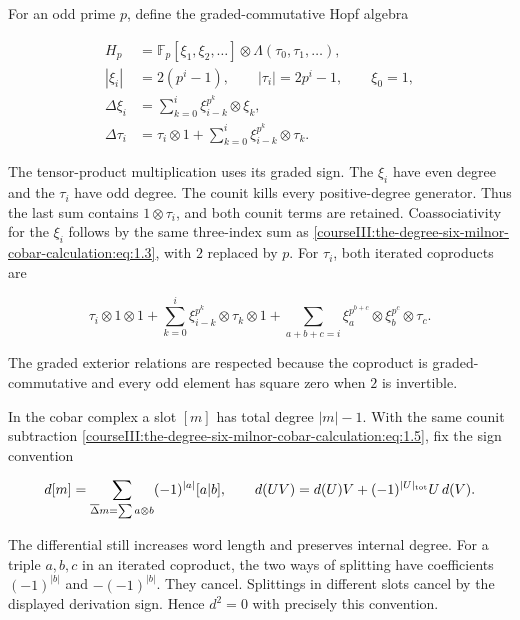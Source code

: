 For an odd prime \(p\), define the graded-commutative Hopf algebra

\begin{equation}
\begin{aligned}
 H_p&=\mathbb F _p[\xi_1,\xi_2,\ldots]
                  \otimes\Lambda(\tau_0,\tau_1,\ldots),\\
 |\xi_i|&=2(p^i-1),\qquad |\tau_i|=2p^i-1,\qquad \xi_0=1,\\
 \Delta\xi_i&=\sum_{k=0}^{i}\xi_{i-k}^{p^k}\otimes\xi_k,\\
 \Delta\tau_i&=\tau_i\otimes1+
                  \sum_{k=0}^{i}\xi_{i-k}^{p^k}\otimes\tau_k .
\end{aligned}
\label{courseIII:the-degree-six-milnor-cobar-calculation:eq:6.1}
\end{equation}

The tensor-product multiplication uses its graded sign. The \(\xi_i\) have even degree and the \(\tau_i\) have odd degree. The counit kills every positive-degree generator. Thus the last sum contains \(1\otimes\tau_i\), and both counit terms are retained. Coassociativity for the \(\xi_i\) follows by the same three-index sum as \eqref{courseIII:the-degree-six-milnor-cobar-calculation:eq:1.3}, with \(2\) replaced by \(p\). For \(\tau_i\), both iterated coproducts are

\begin{equation}
\tau_i\otimes1\otimes1
 +\sum_{k=0}^{i}\xi_{i-k}^{p^k}\otimes\tau_k\otimes1
 +\sum_{a+b+c=i}
       \xi_a^{p^{b+c}}\otimes\xi_b^{p^c}\otimes\tau_c .
 \label{courseIII:the-degree-six-milnor-cobar-calculation:eq:6.2}
\end{equation}

The graded exterior relations are respected because the coproduct is graded-commutative and every odd element has square zero when \(2\) is invertible.

In the cobar complex a slot \([m]\) has total degree \(|m|-1\). With the same counit subtraction \eqref{courseIII:the-degree-six-milnor-cobar-calculation:eq:1.5}, fix the sign convention

\begin{equation}
d[m]=\sum_{\overline\Delta m=\sum a\otimes b}
                  (-1)^{|a|}[a|b],\qquad
 d(UV)=d(U)V+(-1)^{|U|_{\rm tot}}U\,d(V).
 \label{courseIII:the-degree-six-milnor-cobar-calculation:eq:6.3}
\end{equation}

The differential still increases word length and preserves internal degree. For a triple \(a,b,c\) in an iterated coproduct, the two ways of splitting have coefficients \((-1)^{|b|}\) and \(-(-1)^{|b|}\). They cancel. Splittings in different slots cancel by the displayed derivation sign. Hence \(d^2=0\) with precisely this convention.

